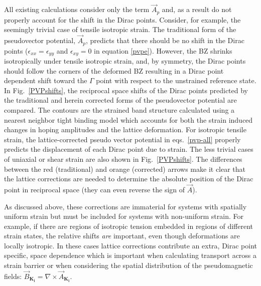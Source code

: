 All existing calculations consider only the term $\vec{A}_p$ and, as a result do not properly account for the shift in the Dirac points.
Consider, for example, the seemingly trivial case of tensile isotropic strain.
The traditional form of the pseudovector potential, $\vec{A}_p$, predicts that there should be no shift in the Dirac points ($\epsilon_{xx}=\epsilon_{yy}$ and $\epsilon_{xy}=0$ in equation \ref{pvpe}).
However, the BZ shrinks isotropically under tensile isotropic strain, and, by symmetry, the Dirac points should follow the corners of the deformed BZ resulting in a Dirac point dependent shift toward the $\Gamma$ point with respect to the unstrained reference state.
In Fig.~\ref{PVPshifts}, the reciprocal space shifts of the Dirac points predicted by the traditional and herein corrected forms of the pseudovector potential are compared.
The contours are the strained band structure calculated using a nearest neighbor tight binding model which accounts for both the strain induced changes in hoping amplitudes and the lattice deformation\cite{Pereira2009}.
For isotropic tensile strain, the lattice-corrected pseudo vector potential in eqs.~\eqref{pvp-all} properly predicts the displacement of each Dirac point due to strain.
The less trivial cases of uniaxial or shear strain are also shown in Fig.~\ref{PVPshifts}. The differences between the red (traditional) and orange (corrected) arrows make it clear that the lattice corrections are needed to determine the absolute position of the Dirac point in reciprocal space (they can even reverse the sign of $\vec{A}$).

As discussed above, these corrections are immaterial for systems with spatially uniform strain but must be included for systems with non-uniform strain.
For example, if there are regions of isotropic tension embedded in regions of different strain states, the relative shifts \emph{are} important, even though deformations are locally isotropic.
In these cases lattice corrections contribute an extra, Dirac point specific, space dependence which is important when calculating transport across a strain barrier or when considering the spatial distribution of the pseudomagnetic fields: $\vec{B}_{\bm{K_i}} = \nabla \times \vec{A}_{\bm{K_i}}$.

